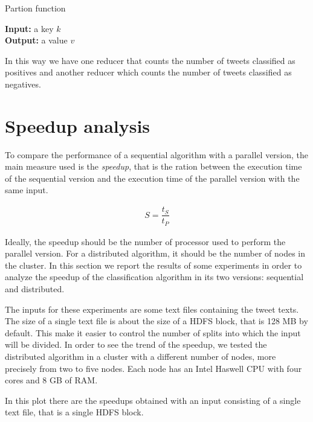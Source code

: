 \documentclass[10pt,twocolumn,letterpaper]{article}
\begin{document}
\begin{algorithm}[H]
\caption{Partion function}
\textbf{Input:} a key $k$ \\
\textbf{Output:} a value $v$ \\
\begin{algorithmic}
        \State {}
        \State {}
    \Else
        \State {} 
    \EndIf
\end{algorithmic}
\end{algorithm}

In this way we have one reducer that counts the number of tweets classified as positives and another reducer which counts the number of tweets classified as negatives.

\section{Speedup analysis}

To compare the performance of a sequential algorithm with a parallel version, the main measure used is the \textit{speedup}, that is the ration between the execution time of the sequential version and the execution time of the parallel version with the same input.

\begin{align}
S = \dfrac{t_S}{t_P}
\end{align}

Ideally, the speedup should be the number of processor used to perform the parallel version. For a distributed algorithm, it should be the number of nodes in the cluster. In this section we report the results of some experiments in order to analyze the speedup of the classification algorithm in its two versions: sequential and distributed.

The inputs for these experiments are some text files containing the tweet texts. The size of a single text file is about the size of a HDFS block, that is 128 MB by default. This make it easier to control the number of splits into which the input will be divided. In order to see the trend of the speedup, we tested the distributed algorithm in a cluster with a different number of nodes, more precisely from two to five nodes. Each node has an Intel Haswell CPU with four cores and 8 GB of RAM.

In this plot there are the speedups obtained with an input consisting of a single text file, that is a single HDFS block.
\end{document}

